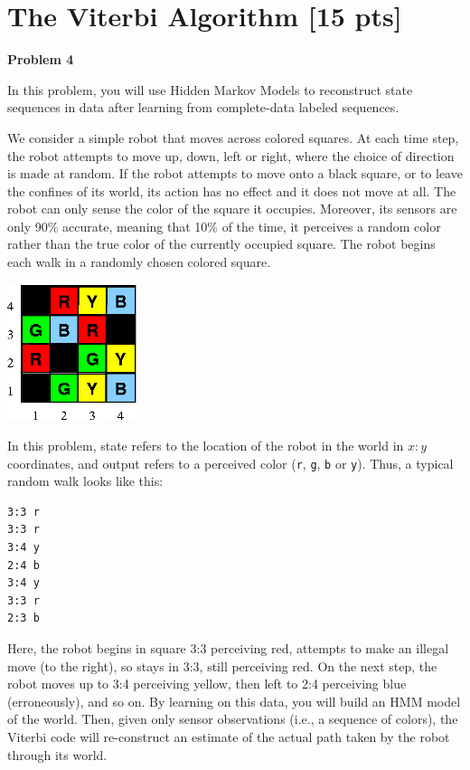 \documentclass[submit]{harvardml}
\begin{document}
\newpage

\section*{The Viterbi Algorithm [15 pts]}

{\bf Problem 4}
\medskip

In this problem, you will use Hidden Markov Models to reconstruct
state sequences in data after learning from complete-data labeled
sequences.

We consider a simple robot that moves across colored squares. At each
time step, the robot attempts to move up, down, left or right, where
the choice of direction is made at random.  If the robot attempts to
move onto a black square, or to leave the confines of its world, its
action has no effect and it does not move at all.  The robot can only
sense the color of the square it occupies.  Moreover, its sensors are
only 90\% accurate, meaning that 10\% of the time, it perceives a
random color rather than the true color of the currently occupied
square.  The robot begins each walk in a randomly chosen colored
square.


\begin{center}
  \includegraphics[width=1.5in]{robot_maze.png}
\end{center}

In this problem, state refers to the location of the robot in the
world in $x:y$ coordinates, and output refers to a perceived color
({\tt r}, {\tt g}, {\tt b} or {\tt y}). Thus, a typical random walk
looks like this:



\begin{verbatim}
3:3 r
3:3 r
3:4 y
2:4 b
3:4 y
3:3 r
2:3 b
\end{verbatim}

Here, the robot begins in square 3:3 perceiving red, attempts to make
an illegal move (to the right), so stays in 3:3, still perceiving red.
On the next step, the robot moves up to 3:4 perceiving yellow, then
left to 2:4 perceiving blue (erroneously), and so on. By learning
on this data, you will build an HMM model of the world.
Then, given only sensor observations (i.e., a sequence of colors), the
Viterbi code will re-construct an estimate of the actual path taken by
the robot through its world.
\end{document}
